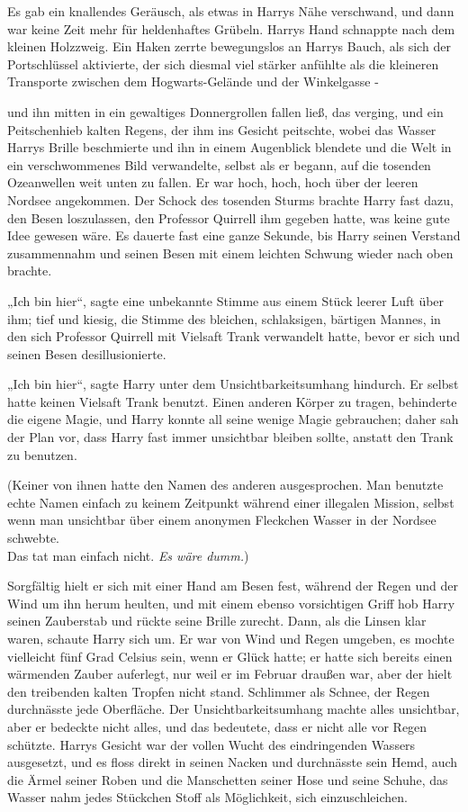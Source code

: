 {Es gab ein knallendes Geräusch, als etwas in Harrys Nähe verschwand, und dann war keine Zeit mehr für heldenhaftes Grübeln. Harrys Hand schnappte nach dem kleinen Holzzweig. Ein Haken zerrte bewegungslos an Harrys Bauch, als sich der Portschlüssel aktivierte, der sich diesmal viel stärker anfühlte als die kleineren Transporte zwischen dem Hogwarts-Gelände und der Winkelgasse -

und ihn mitten in ein gewaltiges Donnergrollen fallen ließ, das verging, und ein Peitschenhieb kalten Regens, der ihm ins Gesicht peitschte, wobei das Wasser Harrys Brille beschmierte und ihn in einem Augenblick blendete und die Welt in ein verschwommenes Bild verwandelte, selbst als er begann, auf die tosenden Ozeanwellen weit unten zu fallen. Er war hoch, hoch, hoch über der leeren Nordsee angekommen. Der Schock des tosenden Sturms brachte Harry fast dazu, den Besen loszulassen, den Professor Quirrell ihm gegeben hatte, was keine gute Idee gewesen wäre. Es dauerte fast eine ganze Sekunde, bis Harry seinen Verstand zusammennahm und seinen Besen mit einem leichten Schwung wieder nach oben brachte.

„Ich bin hier“, sagte eine unbekannte Stimme aus einem Stück leerer Luft über ihm; tief und kiesig, die Stimme des bleichen, schlaksigen, bärtigen Mannes, in den sich Professor Quirrell mit Vielsaft Trank verwandelt hatte, bevor er sich und seinen Besen desillusionierte.

„Ich bin hier“, sagte Harry unter dem Unsichtbarkeitsumhang hindurch. Er selbst hatte keinen Vielsaft Trank benutzt. Einen anderen Körper zu tragen, behinderte die eigene Magie, und Harry konnte all seine wenige Magie gebrauchen; daher sah der Plan vor, dass Harry fast immer unsichtbar bleiben sollte, anstatt den Trank zu benutzen.

(Keiner von ihnen hatte den Namen des anderen ausgesprochen. Man benutzte echte Namen einfach zu keinem Zeitpunkt während einer illegalen Mission, selbst wenn man unsichtbar über einem anonymen Fleckchen Wasser in der Nordsee schwebte.\\ Das tat man einfach nicht. \emph{Es wäre dumm.})

Sorgfältig hielt er sich mit einer Hand am Besen fest, während der Regen und der Wind um ihn herum heulten, und mit einem ebenso vorsichtigen Griff hob Harry seinen Zauberstab und rückte seine Brille zurecht. Dann, als die Linsen klar waren, schaute Harry sich um. Er war von Wind und Regen umgeben, es mochte vielleicht fünf Grad Celsius sein, wenn er Glück hatte; er hatte sich bereits einen wärmenden Zauber auferlegt, nur weil er im Februar draußen war, aber der hielt den treibenden kalten Tropfen nicht stand. Schlimmer als Schnee, der Regen durchnässte jede Oberfläche. Der Unsichtbarkeitsumhang machte alles unsichtbar, aber er bedeckte nicht alles, und das bedeutete, dass er nicht alle vor Regen schützte. Harrys Gesicht war der vollen Wucht des eindringenden Wassers ausgesetzt, und es floss direkt in seinen Nacken und durchnässte sein Hemd, auch die Ärmel seiner Roben und die Manschetten seiner Hose und seine Schuhe, das Wasser nahm jedes Stückchen Stoff als Möglichkeit, sich einzuschleichen.

}
